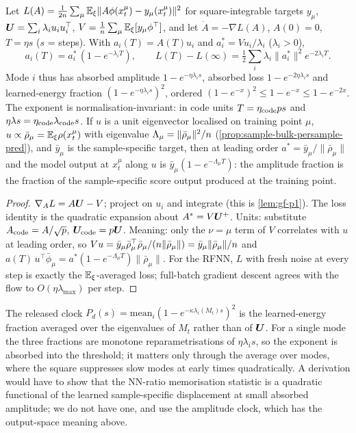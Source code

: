 \begin{proposition}[proved]\label{prop:mode-clocks-pred}
Let $L(A)=\frac1{2n}\sum_\mu\mathbb{E}_\xi\|A\phi(x_t^\mu)-y_\mu(x_t^\mu)\|^2$ for square-integrable targets $y_\mu$, $\bm{U}=\sum_i\lambda_iu_iu_i^\top$, $V=\frac1{n}\sum_\mu\mathbb{E}_\xi[y_\mu\phi^\top]$, and let $\dot A=-\nabla L(A)$, $A(0)=0$, $T=\eta s$ ($s$ = steps). With $a_i(T)=A(T)u_i$ and $a_i^*=Vu_i/\lambda_i$ ($\lambda_i>0$),
\[ a_i(T)=a_i^*\,(1-e^{-\lambda_iT}),\qquad L(T)-L(\infty)=\tfrac12\sum_i\lambda_i\|a_i^*\|^2e^{-2\lambda_iT}. \]
Mode $i$ thus has absorbed amplitude $1-e^{-\eta\lambda_is}$, absorbed loss $1-e^{-2\eta\lambda_is}$ and learned-energy fraction $(1-e^{-\eta\lambda_is})^2$, ordered $(1-e^{-x})^2\le1-e^{-x}\le1-e^{-2x}$. The exponent is normalisation-invariant: in code units $T=\eta_{\rm code}p s$ and $\eta\lambda s=\eta_{\rm code}\lambda_{\rm code}s$. If $u$ is a unit eigenvector localised on training point $\mu$, $u\propto\bar\rho_\mu=\mathbb{E}_\xi\rho(x_t^\mu)$ with eigenvalue $\Lambda_\mu=\|\bar\rho_\mu\|^2/n$ (\cref{prop:sample-bulk-persample-pred}), and $\bar y_\mu$ is the sample-specific target, then at leading order $a^*=\bar y_\mu/\|\bar\rho_\mu\|$ and the model output at $x_t^\mu$ along $u$ is $\bar y_\mu(1-e^{-\Lambda_\mu T})$: the amplitude fraction is the fraction of the sample-specific score output produced at the training point.
\end{proposition}
\begin{proof}
$\nabla_AL=A\bm{U}-V$; project on $u_i$ and integrate (this is \cref{lem:gf-p1}). The loss identity is the quadratic expansion about $A^*=V\bm{U}^+$. Units: substitute $A_{\rm code}=A/\sqrt{p}$, $\bm{U}_{\rm code}=p\bm{U}$. Meaning: only the $\nu=\mu$ term of $V$ correlates with $u$ at leading order, so $Vu=\bar y_\mu\bar\rho_\mu^\top\bar\rho_\mu/(n\|\bar\rho_\mu\|)=\bar y_\mu\|\bar\rho_\mu\|/n$ and $a(T)\,u^\top\bar\phi_\mu=a^*(1-e^{-\Lambda_\mu T})\|\bar\rho_\mu\|$. For the RFNN, $L$ with fresh noise at every step is exactly the $\mathbb{E}_\xi$-averaged loss; full-batch gradient descent agrees with the flow to $O(\eta\lambda_{\max})$ per step.
\end{proof}

\begin{remark}\label{rem:square-pred}
The released clock $P_d(s)=\mathrm{mean}_i(1-e^{-\kappa\lambda_i(M_t)s})^2$ is the learned-energy fraction averaged over the eigenvalues of $M_t$ rather than of $\bm{U}$. For a single mode the three fractions are monotone reparametrisations of $\eta\lambda_is$, so the exponent is absorbed into the threshold; it matters only through the average over modes, where the square suppresses slow modes at early times quadratically. A derivation would have to show that the NN-ratio memorisation statistic is a quadratic functional of the learned sample-specific displacement at small absorbed amplitude; we do not have one, and use the amplitude clock, which has the output-space meaning above.
\end{remark}

